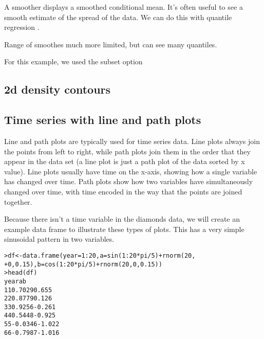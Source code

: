 A smoother displays a smoothed conditional mean.  It's often useful to see a smooth estimate of the spread of the data.  We can do this with quantile regression \citep{koenker:2005}.

Range of smoothes much more limited, but can see many quantiles.  

% 

For this example, we used the subset option

\subsection{2d density contours}

\subsection{Time series with line and path plots}\label{sub:line_plot}

Line and path plots are typically used for time series data.  Line plots always join the points from left to right, while path plots join them in the order that they appear in the data set (a line plot is just a path plot of the data sorted by x value).  Line plots usually have time on the x-axis, showing how a single variable has changed over time.  Path plots show how two variables have simultaneously changed over time, with time encoded in the way that the points are joined together.

Because there isn't a time variable in the diamonds data, we will create an example data frame to illustrate these types of plots.  This has a very simple sinusoidal pattern in two variables.

\begin{alltt}
> df <- data.frame(year = 1:20, a = sin(1:20 * pi/5) + rnorm(20, 
+     0, 0.15), b = cos(1:20 * pi/5) + rnorm(20, 0, 0.15))
> head(df)
  year       a      b
1    1  0.7029  0.655
2    2  0.8779  0.126
3    3  0.9256 -0.261
4    4  0.5448 -0.925
5    5 -0.0346 -1.022
6    6 -0.7987 -1.016

\end{alltt}


